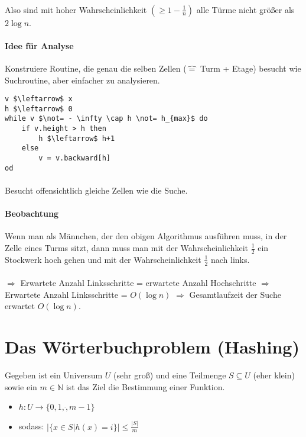 
\paragraph*{} Also sind mit hoher Wahrscheinlichkeit $(\geq 1 - \frac{1}{n})$ alle Türme nicht größer als $2 \log n$.

\paragraph*{Idee für Analyse} Konstruiere Routine, die genau die selben Zellen ($\overbrace{=}$ Turm + Etage) besucht wie Suchroutine, aber einfacher zu analysieren. %


\begin{lstlisting}[mathescape]
v $\leftarrow$ x
h $\leftarrow$ 0
while v $\not= - \infty \cap h \not= h_{max}$ do
	if v.height > h then
		h $\leftarrow$ h+1
	else
		v = v.backward[h]
od
\end{lstlisting} %

\paragraph*{} Besucht offensichtlich gleiche Zellen wie die Suche.

\paragraph*{Beobachtung} Wenn man als Männchen, der den obigen Algorithmus ausführen muss, in der Zelle eines Turms sitzt, dann muss man mit der Wahrscheinlichkeit $\frac{1}{2}$ ein Stockwerk hoch gehen und mit der Wahrscheinlichkeit $\frac{1}{2}$ nach links.
\paragraph*{} $\Rightarrow$ Erwartete Anzahl Linksschritte = erwartete Anzahl Hochschritte
$\Rightarrow$ Erwartete Anzahl Linksschritte = $O(\log n)$
$\Rightarrow$ Gesamtlaufzeit der Suche erwartet $O(\log n)$. %

\section{Das Wörterbuchproblem (Hashing)}
Gegeben ist ein Universum $U$ (sehr groß) und eine Teilmenge $S \subseteq U$ (eher klein) sowie ein $m \in \mathbb{N}$ ist das Ziel die Bestimmung einer Funktion.
\begin{itemize}
	\item[] $h : U \rightarrow \{ 0,1,\dot,m-1 \}$
	\item[]sodass: $|\{ x \in S | h(x) =i \}| \leq \frac{|S|}{m}$ %
\end{itemize}

